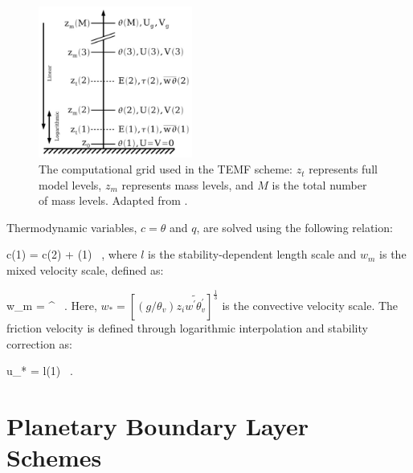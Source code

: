 \begin{figure}[H]
\begin{center}
\includegraphics[width=0.45\textwidth]{figures/chapter3/temfgrid}
\end{center}
\caption{The computational grid used in the TEMF scheme: $z_t$ represents full model levels, $z_m$ represents mass levels, and $M$ is the total number of mass levels. Adapted from \citet{Angevine2010}. }
\label{figure301}
\end{figure}


Thermodynamic variables, $c = \theta$ and $q$, are solved using the following relation:

\be
c(1) = c(2) + (1)    \, , \label{equation 334}
\ee
\noindent
 where $l$ is the stability-dependent length scale and $w_m$ is the mixed velocity scale, defined as:

\be
w_m = ^{} \, . \label{equation335}
\ee
\noindent
 Here, $w_* = \left[\left(g/\theta_v\right)z_i \widetilde{w^{\prime}\theta_v^{\prime}}\right]^{\frac{1}{3}}$ is the convective velocity scale. The friction velocity is defined through logarithmic interpolation and stability correction as:

\be
u_* =   l(1) \, .
\label{equation336}
\ee


\section{Planetary Boundary Layer Schemes}
\label{pbl-26}

